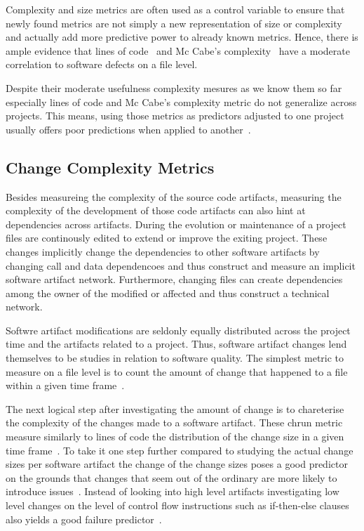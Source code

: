 Complexity and size metrics are often used as a control variable to ensure that newly found metrics are not simply a new representation of size or complexity and actually add more predictive power to already known metrics.
Hence, there is ample evidence that lines of code~\cite{shihab:esem:2010,arisholm:isese:2006,jiang:promise:2008,knab:msr:2006,zhang:icsm:2009} and Mc Cabe's complexity~\cite{nagappan:icse:2006,shihab:fse:2011,zimermann:fse:2009,jiang:promise:2008,zimmermann:promise:2207} have a moderate correlation to software defects on a file level.

Despite their moderate usefulness complexity mesures as we know them so far especially lines of code and Mc Cabe's complexity metric do not generalize across projects.
This means, using those metrics as predictors adjusted to one project usually offers poor predictions when applied to another~\cite{zimmermann:fse:2009}. 


\subsection{Change Complexity Metrics}
Besides measureing the complexity of the source code artifacts, measuring the complexity of the development of those code artifacts can also hint at dependencies across artifacts.
During the evolution or maintenance of a project files are continously edited to extend or improve the exiting project.
These changes implicitly change the dependencies to other software artifacts by changing call and data dependencoes and thus construct and measure an implicit software artifact network.
Furthermore, changing files can create dependencies among the owner of the modified or affected and thus construct a technical network.

Softwre artifact modifications are seldonly equally distributed across the project time and the artifacts related to a project.
Thus, software artifact changes lend themselves to be studies in relation to software quality.
The simplest metric to measure on a file level is to count the amount of change that happened to a file within a given time frame~\cite{li:metrics:2005i,moser:icse:2008,cataldo:icse:2011}.

The next logical step after investigating the amount of change is to chareterise the complexity of the changes made to a software artifact. 
These chrun metric measure similarly to lines of code the distribution of the change size in a given time frame~\cite{nagappan:icse:2005,shihab:fse:2011,zimmermann:fse:2009,bell:promise:2011}.
To take it one step further compared to studying the actual change sizes per software artifact the change of the change sizes poses a good predictor on the grounds that changes that seem out of the ordinary are more likely to introduce issues~\cite{hassan:icse:2009}.
Instead of looking into high level artifacts investigating low level changes on the level of control flow instructions such as if-then-else clauses also yields a good failure predictor~\cite{giger:msr:2011}.

